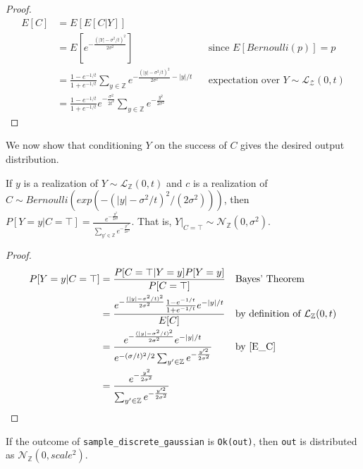 \documentclass{article}
\begin{document}
\begin{proof} 
    \begin{align*} 
        E[C] &= E[E[C|Y]] \\ 
        &= E[e^{-\frac{(|Y| - \sigma^2/t)^2}{2\sigma^2}}] && \text{since } E[Bernoulli(p)] = p \\ 
        &= \frac{1 - e^{-1/t}}{1 + e^{-1/t}} \sum_{y\in \mathbb{Z}} e^{-\frac{(|y| - \sigma^2/t)^2}{2\sigma^2} - |y|/t} && \text{expectation over } Y \sim \mathcal{L}_\mathcal{Z}(0, t) \\ 
        &= \frac{1 - e^{-1/t}}{1 + e^{-1/t}}e^{-\frac{\sigma^2}{2t^2}} \sum_{y\in \mathbb{Z}} e^{-\frac{y^2}{2\sigma^2}} 
    \end{align*} 
\end{proof} 
 
We now show that conditioning $Y$ on the success of $C$ gives the desired output distribution. 
\begin{theorem}\cite{CKS20} 
    \label{P_Yy_CT} If $y$ is a realization of $Y \sim \mathcal{L}_\mathbb{Z}(0, t)$ and $c$ is a realization of $C \sim Bernoulli(exp(-(|y| - \sigma^2 / t)^2 / (2 \sigma^2)))$, then 
    $P[Y=y | C=\top] = \frac{e^{-\frac{y^2}{2\sigma^2}}}{\sum_{y' \in \mathbb{Z}} e^{-\frac{y'^2}{2\sigma^2}}}$. That is, $Y|_{C=\top} \sim \mathcal{N}_\mathbb{Z}(0, \sigma^2)$. 
\end{theorem} 
 
\begin{proof} 
    \begin{align*} 
        P[Y=y | C=\top] &= \frac{P[C=\top|Y=y]P[Y=y]}{P[C=\top]} && \text{Bayes' Theorem} \\ 
        &= \frac{e^{-\frac{(|y| - \sigma^2/t)^2}{2\sigma^2}} \frac{1 - e^{-1/t}}{1 + e^{-1/t}} e^{-|y|/t}}{E[C]} && \text{by definition of } \mathcal{L}_\mathbb{Z}(0, t) \\ 
        &= \frac{e^{-\frac{(|y| - \sigma^2/t)^2}{2\sigma^2}} e^{-|y|/t}}{e^{-(\sigma/t)^2/2} \sum_{y' \in \mathbb{Z}} e^{-\frac{y'^2}{2\sigma^2}}} && \text{by } \ref{E_C}\\ 
        &= \frac{e^{-\frac{y^2}{2\sigma^2}}}{\sum_{y' \in \mathbb{Z}} e^{-\frac{y'^2}{2\sigma^2}}} 
    \end{align*} 
\end{proof} 
 
\begin{lemma}\label{ok-out} 
    If the outcome of \texttt{sample\_discrete\_gaussian} is \texttt{Ok(out)},  
    then \texttt{out} is distributed as $\mathcal{N}_\mathbb{Z}(0, scale^2)$. 
\end{lemma} 
 
\end{document}
